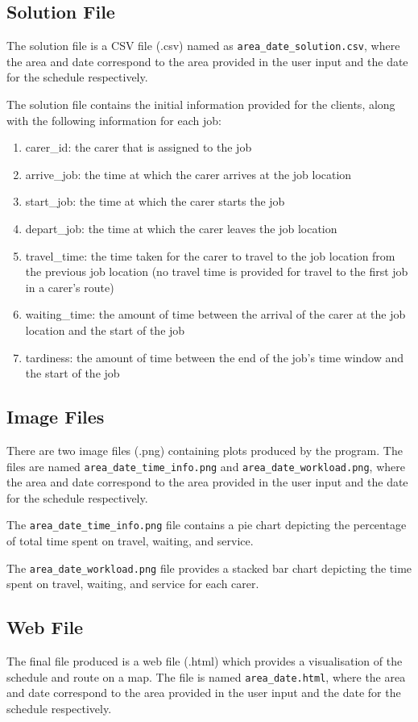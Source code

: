 \documentclass[a4paper]{article}
\begin{document}
\subsection{Solution File}
The solution file is a CSV file (.csv) named as \texttt{area\_date\_solution.csv}, where the area and date correspond to the area provided in the user input and the date for the schedule respectively.

The solution file contains the initial information provided for the clients, along with the following information for each job:
\begin{enumerate}
	\item carer\_id: the carer that is assigned to the job
	\item arrive\_job: the time at which the carer arrives at the job location
	\item start\_job: the time at which the carer starts the job
	\item depart\_job: the time at which the carer leaves the job location
	\item travel\_time: the time taken for the carer to travel to the job location from the previous job location (no travel time is provided for travel to the first job in a carer's route)
	\item waiting\_time: the amount of time between the arrival of the carer at the job location and the start of the job
	\item tardiness: the amount of time between the end of the job's time window and the start of the job 
\end{enumerate}

\subsection{Image Files}
There are two image files (.png) containing plots produced by the program. The files are named \texttt{area\_date\_time\_info.png} and \texttt{area\_date\_workload.png}, where the area and date correspond to the area provided in the user input and the date for the schedule respectively.

The \texttt{area\_date\_time\_info.png} file contains a pie chart depicting the percentage of total time spent on travel, waiting, and service.

The \texttt{area\_date\_workload.png} file provides a stacked bar chart depicting the time spent on travel, waiting, and service for each carer.

\subsection{Web File}
The final file produced is a web file (.html) which provides a visualisation of the schedule and route on a map. The file is named \texttt{area\_date.html}, where the area and date correspond to the area provided in the user input and the date for the schedule respectively.
\end{document}
